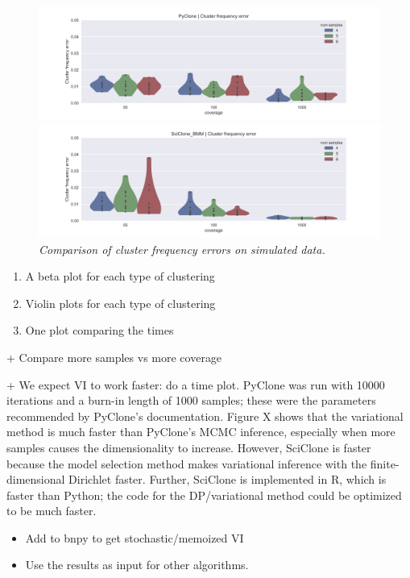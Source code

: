 \documentclass[11pt]{article}
\begin{document}
\newpage
\begin{figure}[h]
\centerline{\includegraphics[scale=0.75]{PyClone_num_clusters.png}}
\centerline{\includegraphics[scale=0.75]{SciClone_num_clusters.png}}
\caption{\emph{Comparison of cluster frequency errors on simulated data.}}
\label{fig:Heterogeneity}
\end{figure}



\begin{enumerate}
\item A beta plot for each type of clustering
\item Violin plots for each type of clustering 
\item One plot comparing the times
\end{enumerate}

+ Compare more samples vs more coverage

+ We expect VI to work faster: do a time plot. PyClone was run with 10000 iterations and a burn-in length of 1000 samples; these were the parameters recommended by PyClone's documentation. Figure X shows that the variational method is much faster than PyClone's MCMC inference, especially when more samples causes the dimensionality to increase. However, SciClone is faster because the model selection method makes variational inference with the finite-dimensional Dirichlet faster. Further, SciClone is implemented in R, which is faster than Python; the code for the DP/variational method could be optimized to be much faster.

\begin{itemize}
	\item Add to bnpy to get stochastic/memoized VI
	\item Use the results as input for other algorithms.
\end{itemize}
\end{document}
